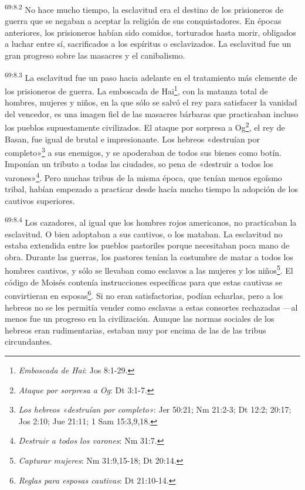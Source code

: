 \par
\textsuperscript{69:8.2} No hace mucho tiempo, la esclavitud era el destino de los prisioneros de guerra que se negaban a aceptar la religión de sus conquistadores. En épocas anteriores, los prisioneros habían sido comidos, torturados hasta morir, obligados a luchar entre sí, sacrificados a los espíritus o esclavizados. La esclavitud fue un gran progreso sobre las masacres y el canibalismo.

\par
\textsuperscript{69:8.3} La esclavitud fue un paso hacia adelante en el tratamiento más clemente de los prisioneros de guerra. La emboscada de Hai\footnote{\textit{Emboscada de Hai}: Jos 8:1-29.}, con la matanza total de hombres, mujeres y niños, en la que sólo se salvó el rey para satisfacer la vanidad del vencedor, es una imagen fiel de las masacres bárbaras que practicaban incluso los pueblos supuestamente civilizados. El ataque por sorpresa a Og\footnote{\textit{Ataque por sorpresa a Og}: Dt 3:1-7.}, el rey de Basan, fue igual de brutal e impresionante. Los hebreos «destruían por completo»\footnote{\textit{Los hebreos «destruían por completo»}: Jer 50:21; Nm 21:2-3; Dt 12:2; 20:17; Jos 2:10; Jue 21:11; 1 Sam 15:3,9,18.} a sus enemigos, y se apoderaban de todos sus bienes como botín. Imponían un tributo a todas las ciudades, so pena de «destruir a todos los varones»\footnote{\textit{Destruir a todos los varones}: Nm 31:7.}. Pero muchas tribus de la misma época, que tenían menos egoísmo tribal, habían empezado a practicar desde hacía mucho tiempo la adopción de los cautivos superiores.

\par
\textsuperscript{69:8.4} Los cazadores, al igual que los hombres rojos americanos, no practicaban la esclavitud. O bien adoptaban a sus cautivos, o los mataban. La esclavitud no estaba extendida entre los pueblos pastoriles porque necesitaban poca mano de obra. Durante las guerras, los pastores tenían la costumbre de matar a todos los hombres cautivos, y sólo se llevaban como esclavos a las mujeres y los niños\footnote{\textit{Capturar mujeres}: Nm 31:9,15-18; Dt 20:14.}. El código de Moisés contenía instrucciones específicas para que estas cautivas se convirtieran en esposas\footnote{\textit{Reglas para esposas cautivas}: Dt 21:10-14.}. Si no eran satisfactorias, podían echarlas, pero a los hebreos no se les permitía vender como esclavas a estas consortes rechazadas ---al menos fue un progreso en la civilización. Aunque las normas sociales de los hebreos eran rudimentarias, estaban muy por encima de las de las tribus circundantes.

